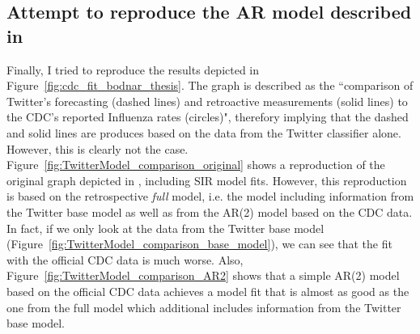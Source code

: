 \documentclass[11pt, a4paper,twoside]{report}\usepackage[]{graphicx}\usepackage[]{color}
\begin{document}
\subsection{Attempt to reproduce the AR model described in \cite{bodnar_data_2015}}
Finally, I tried to reproduce the results depicted in Figure~\ref{fig:cdc_fit_bodnar_thesis}. The graph is described as the ``comparison of Twitter's forecasting (dashed lines) and retroactive measurements (solid lines) to the CDC's reported Influenza rates (circles)", therefory implying that the dashed and solid lines are produces based on the data from the Twitter classifier alone. However, this is clearly not the case. Figure~\ref{fig:TwitterModel_comparison_original} shows a reproduction of the original graph depicted in \citep{bodnar_data_2015}, including SIR model fits. However, this reproduction is based on the retrospective \textit{full} model, i.e. the model including information from the Twitter base model as well as from the AR(2) model based on the CDC data. In fact, if we only look at the data from the Twitter base model (Figure~\ref{fig:TwitterModel_comparison_base_model}), we can see that the fit with the official CDC data is much worse. Also, Figure~\ref{fig:TwitterModel_comparison_AR2} shows that a simple AR(2) model based on the official CDC data achieves a model fit that is almost as good as the one from the full model which additional includes information from the Twitter base model.
\end{document}
